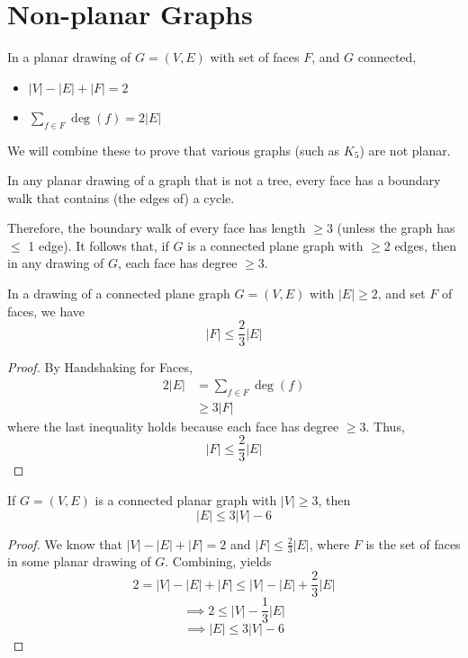 \section{Non-planar Graphs}
In a planar drawing of $ G=(V,E) $ with set of faces $ F $,
and $ G $ connected,
\begin{itemize}
    \item $ |V|-|E|+|F|=2 $
    \item $ \sum\limits_{f\in F}\deg(f)=2|E| $
\end{itemize}
We will combine these to prove that various graphs
(such as $ K_5 $) are not planar.

\begin{thmbox}
    \begin{prop}
        In any planar drawing of a graph that is not a tree,
        every face has a boundary walk that contains
        (the edges of) a cycle.
    \end{prop}
\end{thmbox}
Therefore, the boundary walk of every face has
length $ \geqslant 3 $ (unless the graph has $ \leqslant $ 1 edge).
It follows that, if $ G $ is a connected plane graph with $ \geqslant 2 $
edges, then in any drawing of $ G $, each face has degree $ \geqslant 3 $.

\begin{thmbox}
    \begin{prop}
        In a drawing of a connected plane graph $ G=(V,E) $
        with $ |E|\geqslant 2 $, and set $ F $ of faces, we have
        \[ |F|\leqslant \frac{2}{3}|E| \]
    \end{prop}
\end{thmbox}
\begin{proof}
    By Handshaking for Faces,
    \begin{align*}
        2|E|
         & =\sum\limits_{f\in F}\deg(f) \\
         & \geqslant 3|F|
    \end{align*}
    where the last inequality holds because each face has degree $ \geqslant 3 $.
    Thus,
    \[ |F|\leqslant \frac{2}{3}|E| \]
\end{proof}

\begin{thmbox}
    \begin{lemma}\label{bound edge}
        If $ G=(V,E) $ is a connected planar graph with $ |V|\geqslant 3 $,
        then
        \[ |E|\leqslant 3|V|-6 \]
    \end{lemma}
\end{thmbox}
\begin{proof}
    We know that $ |V|-|E|+|F|=2 $ and $ |F|\leqslant \frac{2}{3} |E| $,
    where $ F $ is the set of faces in some planar drawing of $ G $.
    Combining, yields
    \[ 2=|V|-|E|+|F|\leqslant |V|-|E|+\frac{2}{3}|E| \]
    \[ \implies 2\leqslant |V|-\frac{1}{3} |E| \]
    \[ \implies |E|\leqslant 3|V|-6 \]
\end{proof}

